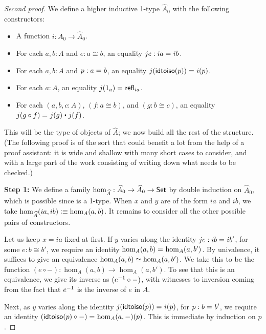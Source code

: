 \begin{proof}[Second proof]
  We define a higher inductive 1-type $\widehat A_0$ with the following constructors:
  \begin{itemize}
  \item A function $i:A_0 \to \widehat A_0$.
  \item For each $a,b:A$ and $e:a\cong b$, an equality $je:ia =_{} ib$.
  \item For each $a,b:A$ and $p:a =_{} b$, an equality $j(\mathsf{idtoiso}(p)) =_{} {i}\!\left({p}\right)$.
  \item For each $a:A$, an equality $j(1_a) =_{} \mathsf{refl}_{ia}$.
  \item For each $(a,b,c:A)$, $(f:a\cong b)$, and $(g:b\cong c)$, an equality $\id{j(g \circ f)}{j(g)\ct j(f)}$.
  \end{itemize}
  This will be the type of objects of $\widehat A$; we now build all the rest of the structure.
  (The following proof is of the sort that could benefit a lot from the help of a proof assistant: it is wide and shallow with many short cases to consider, and with a large part of the work consisting of writing down what needs to be checked.)

  \medskip

  \textbf{Step 1:} We define a family $\hom_{\widehat A}:\widehat A_0\to \widehat A_0 \to \mathsf{Set}$ by double induction on $\widehat A_0$, which is possible since \set is a 1-type.
  When $x$ and $y$ are of the form $ia$ and $ib$, we take $\hom_{\widehat A}(ia,ib) \vcentcolon\equiv \hom_A(a,b)$.
  It remains to consider all the other possible pairs of constructors.

  Let us keep $x=ia$ fixed at first.
  If $y$ varies along the identity $je:ib =_{} ib'$, for some $e:b\cong b'$, we require an identity $\hom_A(a,b) =_{} \hom_A(a,b')$.
  By univalence, it suffices to give an equivalence $\hom_A(a,b) \simeq \hom_A(a,b')$.
  We take this to be the function $(e\circ -):\hom_A(a,b)\to \hom_A(a,b')$.
  To see that this is an equivalence, we give its inverse as $({e}^{-1}\circ -)$, with witnesses to inversion coming from the fact that ${e}^{-1}$ is the inverse of $e$ in $A$.
  
  Next, as $y$ varies along the identity $j(\mathsf{idtoiso}(p)) =_{} {i}\!\left({p}\right)$, for $p:b =_{} b'$, we require an identity $(\mathsf{idtoiso}(p)\circ -) =_{} {\hom_A(a,-)}\!\left({p}\right)$.
  This is immediate by induction on $p$.


\end{proof}
